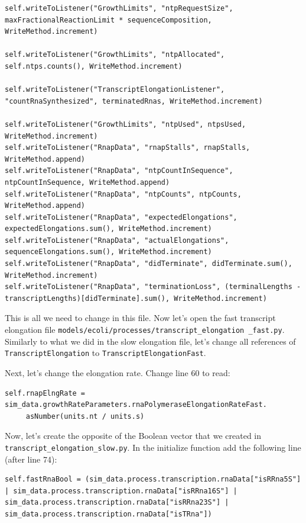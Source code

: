 \documentclass[12pt]{article}
\begin{document}
\begin{lstlisting}
self.writeToListener("GrowthLimits", "ntpRequestSize", maxFractionalReactionLimit * sequenceComposition, WriteMethod.increment)

self.writeToListener("GrowthLimits", "ntpAllocated", self.ntps.counts(), WriteMethod.increment)

self.writeToListener("TranscriptElongationListener", "countRnaSynthesized", terminatedRnas, WriteMethod.increment)

self.writeToListener("GrowthLimits", "ntpUsed", ntpsUsed, WriteMethod.increment)
self.writeToListener("RnapData", "rnapStalls", rnapStalls, WriteMethod.append)
self.writeToListener("RnapData", "ntpCountInSequence", ntpCountInSequence, WriteMethod.append)
self.writeToListener("RnapData", "ntpCounts", ntpCounts, WriteMethod.append)
self.writeToListener("RnapData", "expectedElongations", expectedElongations.sum(), WriteMethod.increment)
self.writeToListener("RnapData", "actualElongations", sequenceElongations.sum(), WriteMethod.increment)
self.writeToListener("RnapData", "didTerminate", didTerminate.sum(), WriteMethod.increment)
self.writeToListener("RnapData", "terminationLoss", (terminalLengths - transcriptLengths)[didTerminate].sum(), WriteMethod.increment)
\end{lstlisting}

This is all we need to change in this file. Now let's open the fast transcript elongation file \texttt{models/ecoli/processes/transcript\_elongation \allowbreak \_fast.py}. Similarly to what we did in the slow elongation file, let's change all references of \texttt{TranscriptElongation} to \texttt{TranscriptElongationFast}.

Next, let's change the elongation rate. Change line 60 to read:

\begin{lstlisting}
self.rnapElngRate = sim_data.growthRateParameters.rnaPolymeraseElongationRateFast.
	 asNumber(units.nt / units.s)
\end{lstlisting}

Now, let's create the opposite of the Boolean vector that we created in \texttt{transcript\_elongation\_slow.py}. In the initialize function add the following line (after line 74):

\lstset{language=Python}
\begin{lstlisting}
self.fastRnaBool = (sim_data.process.transcription.rnaData["isRRna5S"] | sim_data.process.transcription.rnaData["isRRna16S"] | sim_data.process.transcription.rnaData["isRRna23S"] | sim_data.process.transcription.rnaData["isTRna"])
\end{lstlisting}
\end{document}
